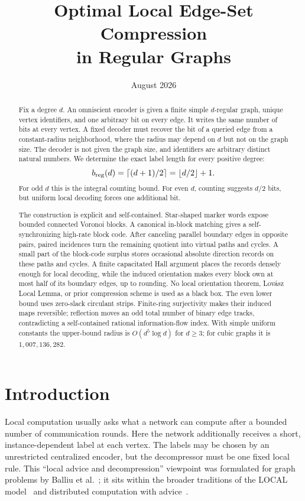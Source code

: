 \documentclass[11pt]{article}
\title{\vspace{-1.2cm}\textbf{Optimal Local Edge-Set Compression\\
in Regular Graphs}}
\author{}
\date{August 2026}
\theoremstyle{definition}
\theoremstyle{remark}
\newcommand{\ceil}[1]{\left\lceil #1\right\rceil}
\newcommand{\floor}[1]{\left\lfloor #1\right\rfloor}
\begin{document}
\maketitle
\vspace{-0.9cm}

\begin{abstract}
Fix a degree $d$.  An omniscient encoder is given a finite simple
$d$-regular graph, unique vertex identifiers, and one arbitrary bit on every
edge.  It writes the same number of bits at every vertex.  A fixed decoder
must recover the bit of a queried edge from a constant-radius neighborhood,
where the radius may depend on $d$ but not on the graph size.  The decoder
is not given the graph size, and identifiers are arbitrary distinct natural
numbers.  We determine
the exact label length for every positive degree:
\[
 b_{\rm reg}(d)=\ceil{(d+1)/2}=\floor{d/2}+1.
\]
For odd $d$ this is the integral counting bound.  For even $d$, counting
suggests $d/2$ bits, but uniform local decoding forces one additional bit.

The construction is explicit and self-contained.  Star-shaped marker words
expose bounded connected Voronoi blocks.  A canonical in-block matching gives a
self-synchronizing high-rate block code.  After canceling parallel boundary
edges in opposite pairs, paired incidences turn the remaining quotient into
virtual paths and cycles.  A small part of the block-code surplus stores
occasional absolute direction records on these paths and cycles.  A finite
capacitated Hall argument places the records densely enough for local
decoding, while the induced orientation makes every block own at most half
of its boundary edges, up to rounding.  No local orientation theorem, Lov\'asz
Local Lemma, or prior compression scheme is used as a black box.  The even
lower bound uses zero-slack circulant strips.  Finite-ring surjectivity makes
their induced maps reversible; reflection moves an odd total number of binary
edge tracks, contradicting a self-contained rational information-flow index.
With simple uniform constants the upper-bound radius is $O(d^5\log d)$ for
$d\ge3$; for cubic graphs it is $1{,}007{,}136{,}282$.
\end{abstract}

\tableofcontents

\section{Introduction}

Local computation usually asks what a network can compute after a bounded
number of communication rounds.  Here the network additionally receives a
short, instance-dependent label at each vertex.  The labels may be chosen by
an unrestricted centralized encoder, but the decompressor must be one fixed
local rule.  This ``local advice and decompression'' viewpoint was formulated
for graph problems by Balliu et al.~\cite{BalliuEtAl2024Brief,
BalliuEtAl2025LocalAdvice}; it sits within the broader traditions of the
LOCAL model~\cite{NaorStockmeyer1995} and distributed computation with
advice~\cite{FraigniaudEtAl2009Advice}.
\end{document}
